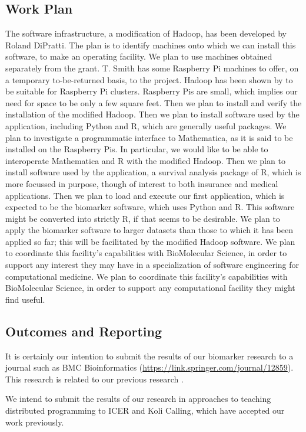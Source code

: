 \documentclass[]{article}
\begin{document}
\subsection{Work Plan}%
The software infrastructure, a modification of Hadoop, has been developed by Roland DiPratti.
The plan is to identify machines onto which we can install this software, to make an operating facility.
We plan to use machines obtained separately from the grant.
T. Smith has some Raspberry Pi machines to offer, on a temporary to-be-returned basis, to the project. Hadoop has been shown by \cite{pihadoop} to be suitable for Raspberry Pi clusters.
Raspberry Pis are small, which implies our need for space to be only a few square feet.
Then we plan to install and verify the installation of the modified Hadoop.
Then we plan to install software used by the application, including Python and R, which are generally useful packages.
We plan to investigate a programmatic interface to Mathematica, as it is said to be installed on the Raspberry Pis.
In particular, we would like to be able to interoperate Mathematica and R with the modified Hadoop.
Then we plan to install software used by the application, a survival analysis package of R, which is more focussed in purpose, though of interest to both insurance and medical applications.
Then we plan to load and execute our first application, which is expected to be the biomarker software, which uses Python and R.  This software might be converted into strictly R, if that seems to be desirable.
 We plan to apply the biomarker software to larger datasets than those to which it has been applied so far; this will be facilitated by the modified Hadoop software.
 We plan to coordinate this facility's capabilities with BioMolecular Science, in order to support any interest they may have in a specialization of software engineering for computational medicine.
 We plan to coordinate this facility's capabilities with BioMolecular Science, in order to support any computational facility they might find useful.
 \subsection{Outcomes and Reporting}
 
 It is certainly our intention to submit the results of our biomarker research to a journal such as BMC Bioinformatics (\url{https://link.springer.com/journal/12859}). This research is related to our previous research \cite{ammar2013developing}.
 
 We intend to submit the results of our research in approaches to teaching distributed programming to ICER and Koli Calling, which have accepted our work previously.
 
\end{document}
